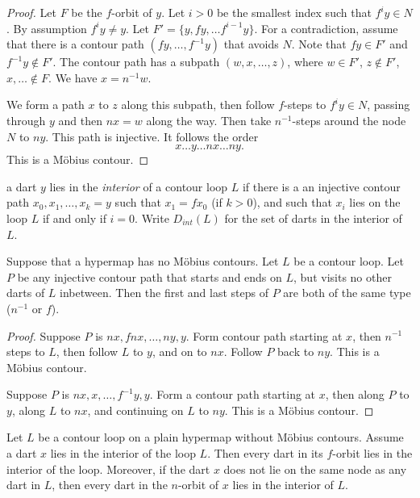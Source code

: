 \begin{proof} Let $F$ be the $f$-orbit of $y$.
Let $i>0$ be the smallest index such that $f^i y\in N$.
By assumption $f^i y \ne y$.
Let $F' = \{y,f y,\ldots f^{i-1} y\}$.
For a contradiction, assume that there is
a contour path  $(f y,\ldots,f^{-1} y)$ that avoids $N$.
Note that $f y\in F'$ and $f^{-1} y\not\in F'$.
%
The contour path has a subpath $(w,x,\ldots,z)$, where
$w\in F'$, $z\not\in F'$,  $x,\ldots\not\in F$.  
We have $x=n^{-1}w$.

We form a path $x$ to $z$ along this subpath, then
follow $f$-steps to $f^i y\in N$, passing through $y$ and
then $n x = w$ along the way.
Then take $n^{-1}$-steps around the node $N$ to $n y$.  This
path is injective.  It follows the order
   $$
   x\ldots y\ldots n x\ldots n y.
   $$
This is a M\"obius contour.
\end{proof}


\begin{definition}[interior]\label{def:interior} 
a dart $y$ lies in the {\it interior} of a contour
loop $L$ if there is a an injective contour path
$x_0,x_1,\ldots,x_k=y$ such that $x_1 = f x_0$ (if $k>0$), and
such that $x_i$ lies on the loop $L$ if and only if $i=0$.
Write $D_{int}(L)$ for the set of darts in the interior of $L$.
\end{definition}

\begin{lemma}
Suppose that a hypermap has no M\"obius contours.
Let $L$ be a contour loop.  Let $P$ be any injective contour path
that starts and ends on $L$, but visits no other darts of $L$ inbetween.  
Then the first and last steps of $P$ are both of the same
type ($n^{-1}$ or $f$).
\end{lemma}

\begin{proof}  Suppose $P$ is $n x,f n x,\ldots,n y,y$.   Form
contour path starting at $x$, then $n^{-1}$ steps to $L$, then
follow $L$ to $y$, and on to $n x$.  Follow $P$ back to $n y$.  This
is a M\"obius contour.

Suppose $P$ is $n x,x,\ldots,f^{-1} y,y$.  Form a contour path
starting at $x$, then along $P$ to $y$, along $L$ to $n x$, and
continuing on $L$ to $n y$.  This is a M\"obius contour.
\end{proof}




\begin{lemma}
Let $L$ be a contour loop on a plain hypermap without
M\"obius contours.  Assume a dart $x$ lies in the interior of the loop $L$. 
Then every dart in its $f$-orbit lies in
the interior of the loop.  Moreover, if the dart
$x$ does not lie on the same node as any dart in $L$, then every
dart in the $n$-orbit of $x$ lies in the interior 
of $L$.
\end{lemma}

